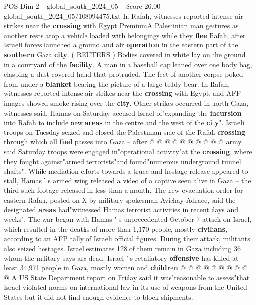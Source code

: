 \begin{textsample}{POS Dim 2 – global\_south\_2024\_05 – Score 26.00 – global\_south\_2024\_05/108094475.txt}  \label{ex:f2_pos_080}
In Rafah, witnesses reported intense air strikes near the \textbf{crossing} with Egypt PremiumA Palestinian man gestures as another rests atop a vehicle loaded with belongings while they \textbf{flee} Rafah, after Israeli forces launched a ground and air \textbf{operation} in the eastern part of the \textbf{southern} Gaza \textbf{city}. ( REUTERS ) Bodies covered in white lay on the ground in a courtyard of the \textbf{facility}.
A man in a baseball cap leaned over one body bag, clasping a dust-covered hand that protruded.
The feet of another corpse poked from under a \textbf{blanket} bearing the picture of a large teddy bear.
In Rafah, witnesses reported intense air strikes near the \textbf{crossing} with Egypt, and AFP images showed smoke rising over the \textbf{city}.
Other strikes occurred in north Gaza, witnesses said.
Hamas on Saturday accused Israel of"expanding the \textbf{incursion} into Rafah to include new \textbf{areas} in the centre and the west of the \textbf{city}".
Israeli troops on Tuesday seized and closed the Palestinian side of the Rafah \textbf{crossing} -- through which all \textbf{fuel} passes into Gaza -- after @ @ @ @ @ @ @ @ @ @ army said Saturday troops were engaged in"operational activity"at the \textbf{crossing}, where they fought against"armed terrorists"and found"numerous underground tunnel shafts".
While mediation efforts towards a truce and hostage release appeared to stall, Hamas ' s armed wing released a video of a captive seen alive in Gaza -- the third such footage released in less than a month.
The new evacuation order for eastern Rafah, posted on X by military spokesman Avichay Adraee, said the designated \textbf{areas} had"witnessed Hamas terrorist activities in recent days and weeks".
The war began with Hamas ' s unprecedented October 7 attack on Israel, which resulted in the deaths of more than 1,170 people, mostly \textbf{civilians}, according to an AFP tally of Israeli official figures.
During their attack, militants also seized hostages.
Israel estimates 128 of them remain in Gaza including 36 whom the military says are dead.
Israel ' s retaliatory \textbf{offensive} has killed at least 34,971 people in Gaza, mostly women and \textbf{children} @ @ @ @ @ @ @ @ @ @ A US State Department report on Friday said it was"reasonable to assess"that Israel violated norms on international law in its use of weapons from the United States but it did not find enough evidence to block shipments.

\end{textsample}
